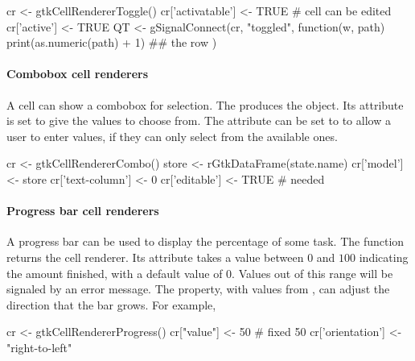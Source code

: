 \begin{Schunk}
\begin{Sinput}
 cr <- gtkCellRendererToggle()
 cr['activatable'] <- TRUE               # cell can be edited
 cr['active'] <- TRUE
 QT <- gSignalConnect(cr, "toggled", function(w, path) {
   print(as.numeric(path) + 1) ## the row
 })
\end{Sinput}
\end{Schunk}

\paragraph{Combobox cell renderers}
A cell can show a combobox for selection. The
 produces the object. Its
 attribute is set to give the values to choose from. The
attribute  can be set to  to allow a user
to enter values, if  they can only select from the
available ones. 

\begin{Schunk}
\begin{Sinput}
 cr <- gtkCellRendererCombo()
 store <- rGtkDataFrame(state.name)
 cr['model'] <- store
 cr['text-column'] <- 0
 cr['editable'] <- TRUE                  # needed
\end{Sinput}
\end{Schunk}

\paragraph{Progress bar cell renderers}
A progress bar can be used to display the percentage of some task. The
 function returns the cell
renderer. Its  attribute takes a value between $0$ and
$100$ indicating the amount finished, with a default value of
$0$. Values out of this range will be signaled by an error message.  The
 property, with values from
, can adjust the direction that the
bar grows.  For example,

\begin{Schunk}
\begin{Sinput}
 cr <- gtkCellRendererProgress()
 cr["value"] <- 50                       # fixed 50%
 cr['orientation'] <- "right-to-left"
\end{Sinput}
\end{Schunk}

